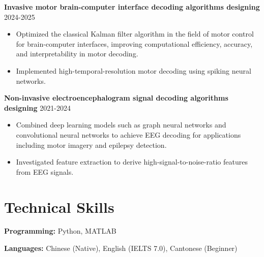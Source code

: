 \documentclass[UTF8,11pt]{ctexart}
\begin{document}
\textbf{Invasive motor brain-computer interface decoding algorithms designing} \hfill 2024-2025
\begin{itemize}[leftmargin=1.0em, topsep=0pt, itemsep=0pt]
    \item Optimized the classical Kalman filter algorithm in the field of motor control for brain-computer interfaces, improving computational efficiency, accuracy, and interpretability in motor decoding.
    \item Implemented high-temporal-resolution motor decoding using spiking neural networks.
\end{itemize}

\textbf{Non-invasive electroencephalogram signal decoding algorithms designing} \hfill 2021-2024
\begin{itemize}[leftmargin=1.0em, topsep=0pt, itemsep=0pt]
    \item Combined deep learning models such as graph neural networks and convolutional neural networks to achieve EEG decoding for applications including motor imagery and epilepsy detection.
    \item Investigated feature extraction to derive high-signal-to-noise-ratio features from EEG signals.
\end{itemize}


\section*{Technical Skills}

\textbf{Programming:} Python, MATLAB

\textbf{Languages:} Chinese (Native), English (IELTS 7.0), Cantonese (Beginner)
\end{document}
